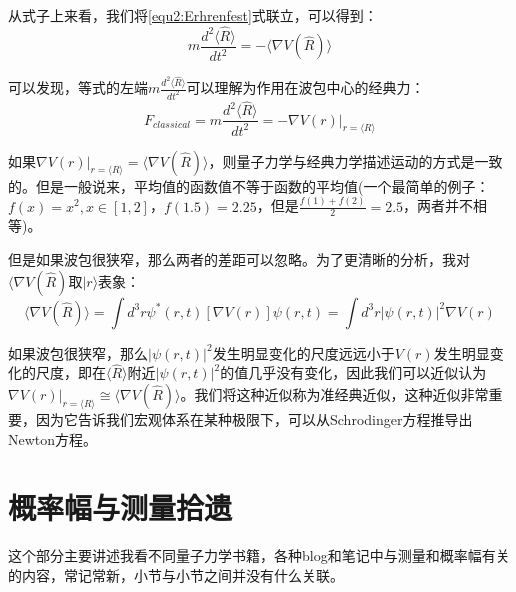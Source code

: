    从式子上来看，我们将\eqref{equ2:Erhrenfest}式联立，可以得到：
   \begin{equation}
       m\frac{d^2\langle\hat{R}\rangle}{dt^2}=-\langle\nabla V(\hat{R})\rangle
   \end{equation}
   
   可以发现，等式的左端$m\frac{d^2\langle\hat{R}\rangle}{dt^2}$可以理解为作用在波包中心的经典力：
   \begin{equation}
       F_{classical}=m\frac{d^2\langle\hat{R}\rangle}{dt^2}=-\nabla \left.V(r)\right|_{r=\langle R\rangle}
   \end{equation}
   
   如果$\nabla \left.V(r)\right|_{r=\langle R\rangle}=\langle\nabla V(\hat{R})\rangle$，则量子力学与经典力学描述运动的方式是一致的。但是一般说来，平均值的函数值不等于函数的平均值(一个最简单的例子：$f(x)=x^2,x\in[1,2]$，$f(1.5)=2.25$，但是$\frac{f(1)+f(2)}{2}=2.5$，两者并不相等)。
   
   但是如果波包很狭窄，那么两者的差距可以忽略。为了更清晰的分析，我对$\langle \nabla V(\hat{R})$取$|r\rangle$表象：
   \begin{equation}
        \langle \nabla V(\hat{R})\rangle=\int d^3r \psi^*(r,t)[\nabla V(r)]\psi(r,t)=\int d^3r|\psi(r,t)|^2\nabla V(r)
   \end{equation}
   
   如果波包很狭窄，那么$|\psi(r,t)|^2$发生明显变化的尺度远远小于$V(r)$发生明显变化的尺度，即在$\langle\hat{R}\rangle$附近$|\psi(r,t)|^2$的值几乎没有变化，因此我们可以近似认为$\nabla \left.V(r)\right|_{r=\langle R\rangle}\cong\langle\nabla V(\hat{R})\rangle$。我们将这种近似称为准经典近似，这种近似非常重要，因为它告诉我们宏观体系在某种极限下，可以从Schrodinger方程推导出Newton方程。
\section{概率幅与测量拾遗}
这个部分主要讲述我看不同量子力学书籍，各种blog和笔记中与测量和概率幅有关的内容，常记常新，小节与小节之间并没有什么关联。
